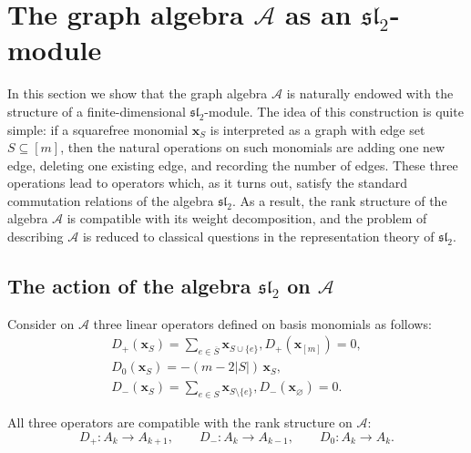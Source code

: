 \documentclass[10pt,a4paper]{amsart}
\begin{document}
\section{The graph algebra $\mathcal A$ as an $\mathfrak{sl}_2$-module}

In this section we show that the graph algebra $\mathcal A$ is naturally
endowed with the structure of a finite-dimensional $\mathfrak{sl}_2$-module.
The idea of this construction is quite simple: if a squarefree monomial
$\boldsymbol{x}_S$ is interpreted as a graph with edge set $S\subseteq[m]$,
then the natural operations on such monomials are adding one new edge,
deleting one existing edge, and recording the number of edges.
These three operations lead to operators which, as it turns out, satisfy the
standard commutation relations of the algebra $\mathfrak{sl}_2$.
As a result, the rank structure of the algebra $\mathcal A$ is compatible
with its weight decomposition, and the problem of describing $\mathcal A$
is reduced to classical questions in the representation theory of
$\mathfrak{sl}_2$.

\subsection{The action of the algebra $\mathfrak{sl}_2$ on $\mathcal {A}$}

Consider on $\mathcal {A}$ three linear operators defined on basis monomials as follows:
\begin{gather*}
D_+(\boldsymbol{x}_S)=\sum_{e\in\overline S}\boldsymbol{x}_{S\cup\{e\}}, D_+(\boldsymbol{x}_{[m]})=0,\\
D_0(\boldsymbol{x}_S)=-(m-2|S|)\,\boldsymbol{x}_S,\\
D_-(\boldsymbol{x}_S)=\sum_{e\in S}\boldsymbol{x}_{S\setminus\{e\}},D_-(\boldsymbol{x}_\varnothing)=0.
\end{gather*}

All three operators are compatible with the rank structure on $\mathcal A:$
$$
D_+:A_k\to A_{k+1},\qquad
D_-:A_k\to A_{k-1},\qquad
D_0:A_k\to A_k.
$$
\end{document}
